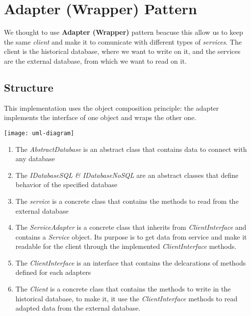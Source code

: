\section{Adapter (Wrapper) Pattern}

We thought to use \textbf{Adapter (Wrapper)} pattern beacuse this allow us to keep the same \textit{client} and make it to comunicate with different types of \textit{services}. The client is the historical database, where we want to write on it, and the services are the external database, from which we want to read on it.

\subsection{Structure}

This implementation uses the object composition principle: the adapter implements the interface of one object and wraps the other one.

\begin{center}
\texttt{[image: uml-diagram]}
\end{center}

\begin{enumerate}
	\item The \textit{AbstractDatabase} is an abstract class that contains data to connect with any database

	\item The \textit{IDatabaseSQL \& IDatabaseNoSQL} are an abstract classes that define behavior of the specified database

	\item The \textit{service} is a concrete class that contains the methods to read from the external database

	\item The \textit{ServiceAdapter} is a concrete class that inherits from \textit{ClientInterface} and contains a \textit{Service} object. Its purpose is to get data from service and make it readable for the client through the implemented \textit{ClientInterface} methods.

	\item The \textit{ClientInterface} is an interface that contains the delcarations of methods defined for each adapters

	\item The \textit{Client} is a concrete class that contains the methods to write in the historical database, to make it, it use the \textit{ClientInterface} methods to read adapted data from the external database.
\end{enumerate}

